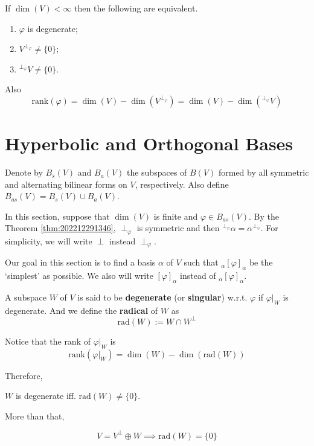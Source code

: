 \begin{theorem}
  If $\dim(V) < \infty$ then the following are equivalent. 
  \begin{enumerate}
    \item $\varphi$ is degenerate; 
    \item $V^{\perp_\varphi} \neq \{ 0 \}$;
    \item ${}^{\perp_\varphi} V \neq \{ 0 \}$.
  \end{enumerate}

  Also 
  \[
    \text{rank}(\varphi) = \dim(V) - \dim(V^{\perp_\varphi}) = \dim(V) - \dim({}^{\perp_\varphi} V)
  \]
\end{theorem}

\section{Hyperbolic and Orthogonal Bases}

Denote by $B_s(V)$ and $B_a(V)$ the subspaces of $B(V)$ formed by all symmetric and alternating bilinear forms on $V$, respectively. Also define $B_{as}(V) = B_s(V) \cup B_a(V)$. 

In this section, suppose that $\dim (V)$ is finite and $\varphi \in B_{as}(V)$. By the Theorem \ref{thm:202212291346}, $\perp_\varphi$ is symmetric and then ${}^{\perp_\varphi} \alpha = \alpha^{\perp_\varphi}$. For simplicity, we will write $\perp$ instead $\perp_\varphi$. 

Our goal in this section is to find a basis $\alpha$ of $V$ such that ${}_\alpha [\varphi]_\alpha$ be the `simplest' as possible. We also will write $[\varphi]_\alpha$ instead of ${}_\alpha [\varphi]_\alpha$.

\begin{definition}
  A subspace $W$ of $V$ is said to be \textbf{degenerate} (or \textbf{singular}) w.r.t. $\varphi$ if $\varphi|_W$ is degenerate. And we define the \textbf{radical} of $W$ as
  \[
    \text{rad}(W) := W \cap W^\perp
  \]
\end{definition}

Notice that the rank of $\varphi|_W$ is 
\[
  \text{rank}(\varphi|_W) = \dim(W) - \dim(\text{rad}(W))
\]

Therefore,
\begin{theorem}
$W$ is degenerate iff. $\text{rad}(W) \neq \{ 0 \}$. 
\end{theorem}

More than that, 
\begin{theorem}\label{thm:202212301111}
\[
  V = V^\perp \oplus W \implies \text{rad}(W) = \{ 0 \}
\]
\end{theorem}


